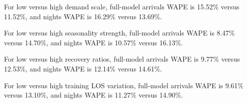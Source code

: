 For low versus high demand scale, full-model arrivals WAPE is 15.52\% versus 11.52\%, and nights WAPE is 16.29\% versus 13.69\%.

For low versus high seasonality strength, full-model arrivals WAPE is 8.47\% versus 14.70\%, and nights WAPE is 10.57\% versus 16.13\%.

For low versus high recovery ratios, full-model arrivals WAPE is 9.77\% versus 12.53\%, and nights WAPE is 12.14\% versus 14.61\%.

For low versus high training LOS variation, full-model arrivals WAPE is 9.61\% versus 13.10\%, and nights WAPE is 11.27\% versus 14.90\%.
